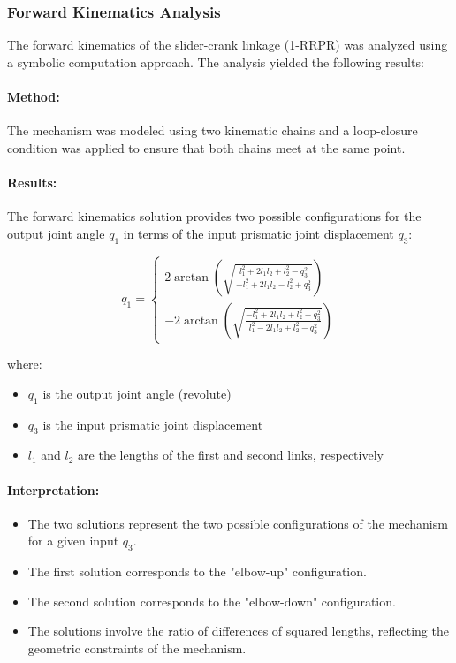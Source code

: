 \begin{solution}
    \subsubsection*{Forward Kinematics Analysis}

The forward kinematics of the slider-crank linkage (1-RRPR) was analyzed using a symbolic computation approach. The analysis yielded the following results:

\paragraph{Method:} The mechanism was modeled using two kinematic chains and a loop-closure condition was applied to ensure that both chains meet at the same point.

\paragraph{Results:} The forward kinematics solution provides two possible configurations for the output joint angle $q_1$ in terms of the input prismatic joint displacement $q_3$:

\begin{equation}
q_1 = \begin{cases}
    2\arctan\left(\sqrt{\frac{l_1^2 + 2l_1l_2 + l_2^2 - q_3^2}{-l_1^2 + 2l_1l_2 - l_2^2 + q_3^2}}\right) \\[10pt]
    -2\arctan\left(\sqrt{\frac{-l_1^2 + 2l_1l_2 + l_2^2 - q_3^2}{l_1^2 - 2l_1l_2 + l_2^2 - q_3^2}}\right)
\end{cases}
\end{equation}

where:
\begin{itemize}
    \item $q_1$ is the output joint angle (revolute)
    \item $q_3$ is the input prismatic joint displacement
    \item $l_1$ and $l_2$ are the lengths of the first and second links, respectively
\end{itemize}

\paragraph{Interpretation:}
\begin{itemize}
    \item The two solutions represent the two possible configurations of the mechanism for a given input $q_3$.
    \item The first solution corresponds to the "elbow-up" configuration.
    \item The second solution corresponds to the "elbow-down" configuration.
    \item The solutions involve the ratio of differences of squared lengths, reflecting the geometric constraints of the mechanism.
\end{itemize}


\end{solution}
